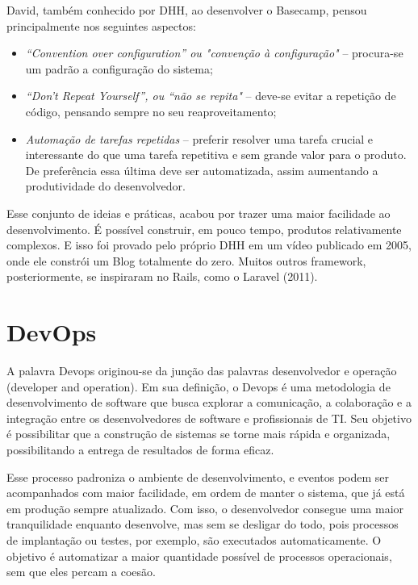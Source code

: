 David, também conhecido por DHH, ao desenvolver o Basecamp, pensou principalmente nos seguintes aspectos:

\begin{itemize}
   \item \textit{“Convention over configuration” ou "convenção à configuração"} -- procura-se um padrão a configuração do sistema;
   \item \textit{“Don’t Repeat Yourself”, ou “não se repita"} -- deve-se evitar a repetição de código, pensando sempre no seu reaproveitamento;
   \item \textit{Automação de tarefas repetidas} -- preferir resolver uma tarefa crucial e interessante do que uma tarefa repetitiva e sem grande valor para o produto. De preferência essa última deve ser automatizada, assim aumentando a produtividade do desenvolvedor.
\end{itemize}

Esse conjunto de ideias e práticas, acabou por trazer uma maior facilidade ao desenvolvimento. É possível construir, em pouco tempo, produtos relativamente complexos. E isso foi provado pelo próprio DHH em um vídeo publicado em 2005, onde ele constrói um Blog totalmente do zero. Muitos outros framework, posteriormente, se inspiraram no Rails, como o Laravel (2011).


\section{DevOps}

A palavra Devops originou-se da junção das palavras desenvolvedor e operação (developer and operation). Em sua definição, o Devops é uma metodologia de desenvolvimento de software que busca explorar a comunicação, a colaboração e a integração entre os desenvolvedores de software e profissionais de TI. Seu objetivo é possibilitar que a construção de sistemas se torne mais rápida e organizada, possibilitando a entrega de resultados de forma eficaz. 

Esse processo padroniza o ambiente de desenvolvimento, e eventos podem ser acompanhados com maior facilidade, em ordem de manter o sistema, que já está em produção sempre atualizado. Com isso, o desenvolvedor consegue uma maior tranquilidade enquanto desenvolve,  mas sem se desligar do todo, pois processos de implantação ou testes, por exemplo, são executados automaticamente. O objetivo é automatizar a maior quantidade possível de processos operacionais, sem que eles percam a coesão.

